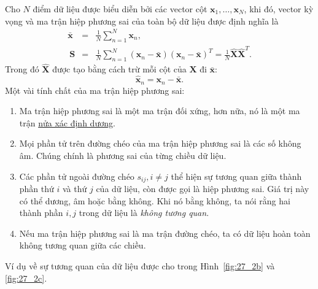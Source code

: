 Cho $N$ điểm dữ liệu được biểu diễn bởi các vector cột $\mathbf{x}_1, \dots, \mathbf{x}_N$, khi đó, {vector kỳ vọng} và {ma trận hiệp phương sai} của toàn bộ dữ liệu được định nghĩa là
\begin{eqnarray} 
    \bar{\mathbf{x}} &=& \frac{1}{N} \sum_{n=1}^N \mathbf{x}_n, \\\ 
    \mathbf{S} &=&  \frac{1}{N}\sum_{n=1}^N (\mathbf{x}_n - \bar{\mathbf{x}})(\mathbf{x}_n - \bar{\mathbf{x}})^T = \frac{1}{N}\hat{\mathbf{X}}\hat{\mathbf{X}}^T.
\end{eqnarray} 
Trong đó $\hat{\mathbf{X}}$ được tạo bằng cách trừ mỗi cột của $\mathbf{X}$ đi $\bar{\mathbf{x}}$: 
\begin{equation} 
    \hat{\mathbf{x}}_n = \mathbf{x}_n - \bar{\mathbf{x}}.
\end{equation} 
\newpage 
Một vài tính chất của ma trận hiệp phương sai: 
\begin{enumerate}

    \item Ma trận hiệp phương sai là một ma trận đối xứng, hơn nữa, nó là một ma trận \href{https://machinelearningcoban.com/2017/03/12/convexity/#positive-semidefinite}{nửa xác định dương}. 
     
    \item Mọi phần tử trên đường chéo của ma trận hiệp phương sai là các số không âm. Chúng chính là phương sai của từng chiều dữ liệu. 
     
    \item Các phần tử ngoài đường chéo $s_{ij}, i \neq j$ thể hiện sự tương quan
    giữa thành phần thứ $i$ và thứ $j$ của dữ liệu, còn được gọi là hiệp phương
    sai. Giá trị này có thể dương, âm hoặc bằng không. Khi nó bằng không, ta nói
    rằng hai thành phần $i, j$ trong dữ liệu là \textit{không tương quan}.
     
    \item Nếu ma trận hiệp phương sai là ma trận đường chéo, ta có dữ liệu hoàn toàn không tương quan giữa các chiều. 
\end{enumerate}
 
Ví dụ về sự tương quan của dữ liệu được cho trong Hình~\ref{fig:27_2b} và
\ref{fig:27_2c}.%
 

